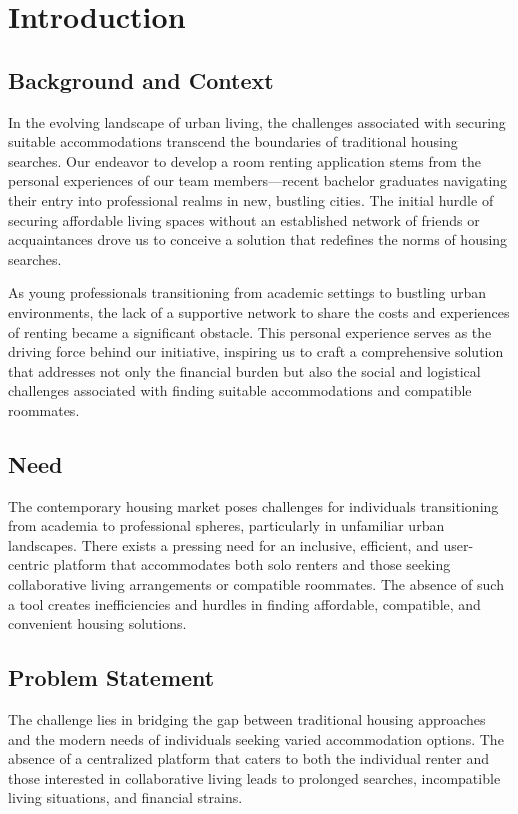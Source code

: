 
\chapter{Introduction}

\label{Chapter1}

\section{Background and Context}
In the evolving landscape of urban living, the challenges associated with
securing suitable accommodations transcend the boundaries of traditional
housing searches. Our endeavor to develop a room renting application stems
from the personal experiences of our team members—recent bachelor graduates
navigating their entry into professional realms in new, bustling cities.
The initial hurdle of securing affordable living spaces without an established
network of friends or acquaintances drove us to conceive a solution that
redefines the norms of housing searches.\par

\medskip

As young professionals transitioning from academic settings to bustling urban
environments, the lack of a supportive network to share the costs and experiences
of renting became a significant obstacle. This personal experience serves as the
driving force behind our initiative, inspiring us to craft a comprehensive
solution that addresses not only the financial burden but also the social and
logistical challenges associated with finding suitable accommodations and
compatible roommates.

\section{Need}
The contemporary housing market poses challenges for individuals transitioning
from academia to professional spheres, particularly in unfamiliar urban
landscapes. There exists a pressing need for an inclusive, efficient, and
user-centric platform that accommodates both solo renters and those seeking
collaborative living arrangements or compatible roommates. The absence of such
a tool creates inefficiencies and hurdles in finding affordable, compatible,
and convenient housing solutions.

\section{Problem Statement}
The challenge lies in bridging the gap between traditional housing approaches
and the modern needs of individuals seeking varied accommodation options.
The absence of a centralized platform that caters to both the individual
renter and those interested in collaborative living leads to prolonged
searches, incompatible living situations, and financial strains.

